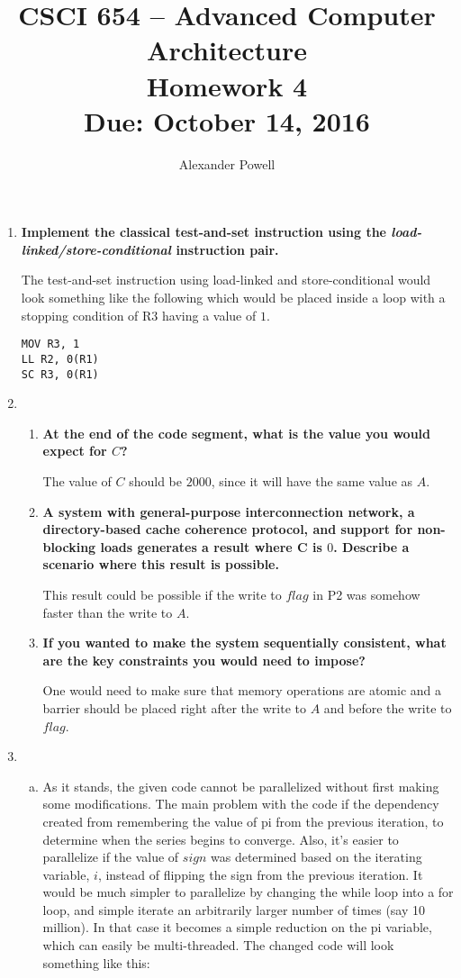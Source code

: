 \documentclass[10pt]{article} %
\title{CSCI 654 -- Advanced Computer Architecture \\
Homework 4 \\
{\large{\bf Due: October 14, 2016}}}
\date{}
\author{Alexander Powell}
\begin{document}
\maketitle
\begin{enumerate}[1.]
\item \textbf{Implement the classical test-and-set instruction using the \textit{load-linked/store-conditional} instruction pair. }

The test-and-set instruction using load-linked and store-conditional would look something like the following which would be placed inside a loop with a stopping condition of R3 having a value of $1$.  
\begin{verbatim}
MOV R3, 1
LL R2, 0(R1)
SC R3, 0(R1)
\end{verbatim}

\item %
\begin{enumerate}
\item \textbf{At the end of the code segment, what is the value you would expect for $C$?  }

The value of $C$ should be $2000$, since it will have the same value as $A$.  

\item \textbf{A system with general-purpose interconnection network, a directory-based cache coherence protocol, and support for non-blocking loads generates a result where C is $0$.  Describe a scenario where this result is possible.  }

This result could be possible if the write to $flag$ in P2 was somehow faster than the write to $A$.  

\item \textbf{If you wanted to make the system sequentially consistent, what are the key constraints you would need to impose?  }

One would need to make sure that memory operations are atomic and a barrier should be placed right after the write to $A$ and before the write to $flag$.  
\end{enumerate}

\item %

\begin{enumerate}[(a)]
\item %

As it stands, the given code cannot be parallelized without first making some modifications.  The main problem with the code if the dependency created from remembering the value of pi from the previous iteration, to determine when the series begins to converge.  Also, it's easier to parallelize if the value of $sign$ was determined based on the iterating variable, $i$, instead of flipping the sign from the previous iteration.  It would be much simpler to parallelize by changing the while loop into a for loop, and simple iterate an arbitrarily larger number of times (say 10 million).  In that case it becomes a simple reduction on the pi variable, which can easily be multi-threaded.  The changed code will look something like this:


\end{enumerate}
\end{enumerate}
\end{document}
